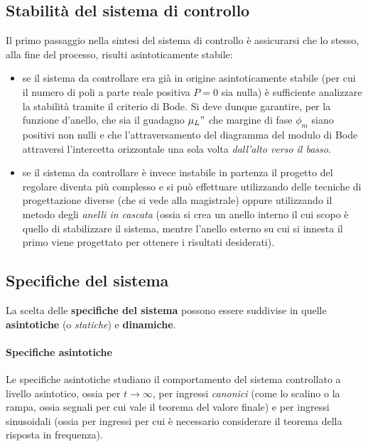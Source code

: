 	\subsection{Stabilità del sistema di controllo}
		Il primo passaggio nella sintesi del sistema di controllo è assicurarsi che lo stesso, alla fine del processo, risulti asintoticamente stabile:
		\begin{itemize}
			\item se il sistema da controllare era già in origine asintoticamente stabile (per cui il numero di poli a parte reale positiva $P = 0 $ sia nulla) è sufficiente analizzare la stabilità tramite il criterio di Bode. Si deve dunque garantire, per la funzione d'anello, che sia il guadagno $\mu_L"$ che margine di fase $\phi_m$ siano positivi non nulli e che l'attraversamento del diagramma del modulo di Bode attraversi l'intercetta orizzontale una sola volta \textit{dall'alto verso il basso}.
			
			\item se il sistema da controllare è invece instabile in partenza il progetto del regolare diventa più complesso e si può effettuare utilizzando delle tecniche di progettazione diverse (che si vede alla magistrale) oppure utilizzando il metodo degli \textit{anelli in cascata} (ossia si crea un anello interno il cui scopo è quello di stabilizzare il sistema, mentre l'anello esterno su cui si innesta il primo viene progettato per ottenere i risultati desiderati).
			
		\end{itemize}
	
	\subsection{Specifiche del sistema}
		La scelta delle \textbf{specifiche del sistema} possono essere suddivise in quelle \textbf{asintotiche} (o \textit{statiche}) e \textbf{dinamiche}.
		
		\paragraph{Specifiche asintotiche} Le specifiche asintotiche studiano il comportamento del sistema controllato a livello asintotico, ossia per $t\rightarrow \infty$, per ingressi \textit{canonici} (come lo scalino o la rampa, ossia segnali per cui vale il teorema del valore finale) e per ingressi sinusoidali (ossia per ingressi per cui è necessario considerare il teorema della risposta in frequenza).
		
